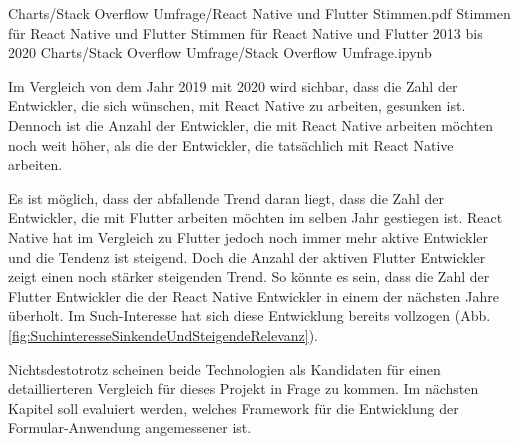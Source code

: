 \begin{alexfigurewithnotebook}{Charts/Stack Overflow Umfrage/React Native und Flutter Stimmen.pdf}
	{Stimmen für React Native und Flutter}
	{Stimmen für React Native und Flutter 2013 bis 2020}
	{Charts/Stack Overflow Umfrage/Stack Overflow Umfrage.ipynb}
	{}
	\label{fig:ReactNativeUndFlutterStimmen}

\end{alexfigurewithnotebook}

Im Vergleich von dem Jahr 2019 mit 2020 wird sichbar, dass die Zahl der Entwickler, die sich wünschen, mit React Native zu arbeiten, gesunken ist. Dennoch ist die Anzahl der Entwickler, die mit React Native arbeiten möchten noch weit höher, als die der Entwickler, die tatsächlich mit React Native arbeiten.

Es ist möglich, dass der abfallende Trend daran liegt, dass die Zahl der Entwickler, die mit Flutter arbeiten möchten im selben Jahr gestiegen ist. React Native hat im Vergleich zu Flutter jedoch noch immer mehr aktive Entwickler und die Tendenz ist steigend. Doch die Anzahl der aktiven Flutter Entwickler zeigt einen noch stärker steigenden Trend. So könnte es sein, dass die Zahl der Flutter Entwickler die der React Native Entwickler in einem der nächsten Jahre überholt. Im Such-Interesse hat sich diese Entwicklung bereits vollzogen (Abb. \ref{fig:SuchinteresseSinkendeUndSteigendeRelevanz}). 

Nichtsdestotrotz scheinen beide Technologien als Kandidaten für einen detaillierteren Vergleich für dieses Projekt in Frage zu kommen. Im nächsten Kapitel soll evaluiert werden, welches Framework für die Entwicklung der Formular-Anwendung angemessener ist.



